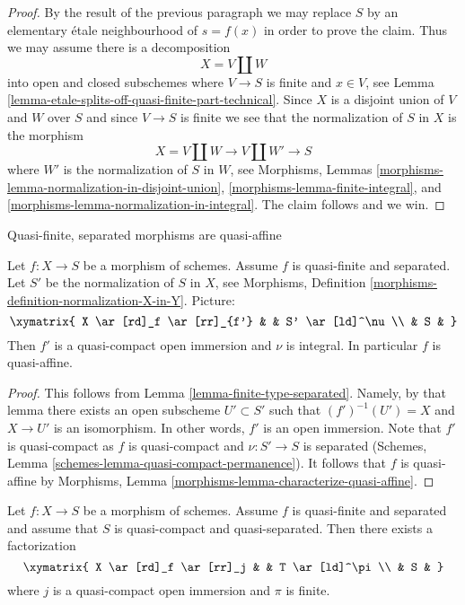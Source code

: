 \begin{proof}
\medskip\noindent
By the result of the previous paragraph we may replace $S$ by an
elementary \'etale neighbourhood of $s = f(x)$ in order to prove the claim.
Thus we may assume there is a decomposition
$$
X = V \amalg W
$$
into open and closed subschemes where $V \to S$ is finite and $x \in V$,
see Lemma \ref{lemma-etale-splits-off-quasi-finite-part-technical}.
Since $X$ is a disjoint union of $V$ and $W$ over $S$ and since
$V \to S$ is finite we see that the
normalization of $S$ in $X$ is the morphism
$$
X = V \amalg W \longrightarrow V \amalg W' \longrightarrow S
$$
where $W'$ is the normalization of $S$ in $W$, see
Morphisms, Lemmas \ref{morphisms-lemma-normalization-in-disjoint-union},
\ref{morphisms-lemma-finite-integral}, and
\ref{morphisms-lemma-normalization-in-integral}.
The claim follows and we win.
\end{proof}

\begin{lemma}
\label{lemma-quasi-finite-separated-quasi-affine}
\begin{slogan}
Quasi-finite, separated morphisms are quasi-affine
\end{slogan}
Let $f : X \to S$ be a morphism of schemes.
Assume $f$ is quasi-finite and separated.
Let $S'$ be the normalization of $S$ in $X$, see
Morphisms, Definition \ref{morphisms-definition-normalization-X-in-Y}.
Picture:
$$
\xymatrix{
X \ar[rd]_f \ar[rr]_{f'} & & S' \ar[ld]^\nu \\
& S &
}
$$
Then $f'$ is a quasi-compact open immersion and $\nu$ is integral.
In particular $f$ is quasi-affine.
\end{lemma}

\begin{proof}
This follows from Lemma \ref{lemma-finite-type-separated}. Namely, by
that lemma there exists an open subscheme $U' \subset S'$ such that
$(f')^{-1}(U') = X$ and $X \to U'$ is an isomorphism. In other
words, $f'$ is an open immersion. Note that $f'$ is quasi-compact as
$f$ is quasi-compact and $\nu : S' \to S$ is separated
(Schemes, Lemma \ref{schemes-lemma-quasi-compact-permanence}).
It follows that $f$ is quasi-affine by
Morphisms, Lemma \ref{morphisms-lemma-characterize-quasi-affine}.
\end{proof}

\begin{lemma}
\label{lemma-quasi-finite-separated-pass-through-finite}
\begin{reference}
\cite[IV Corollary 18.12.13]{EGA}
\end{reference}
Let $f : X \to S$ be a morphism of schemes.
Assume $f$ is quasi-finite and separated and assume that
$S$ is quasi-compact and quasi-separated. Then there exists
a factorization
$$
\xymatrix{
X \ar[rd]_f \ar[rr]_j & & T \ar[ld]^\pi \\
& S &
}
$$
where $j$ is a quasi-compact open immersion and $\pi$ is finite.
\end{lemma}

